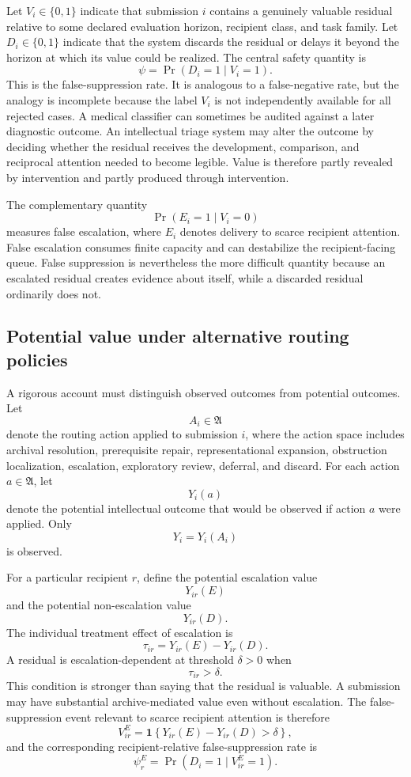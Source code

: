 \documentclass[11pt]{article}
\theoremstyle{definition}
\DeclareMathOperator{\Prob}{Pr}
\newcommand{\ind}{\mathbf{1}}
\begin{document}
Let \(V_i\in\{0,1\}\) indicate that submission \(i\) contains a genuinely valuable residual relative to some declared evaluation horizon, recipient class, and task family. Let \(D_i\in\{0,1\}\) indicate that the system discards the residual or delays it beyond the horizon at which its value could be realized. The central safety quantity is
\[
\psi
=
\Prob(D_i=1\mid V_i=1).
\]
This is the false-suppression rate. It is analogous to a false-negative rate, but the analogy is incomplete because the label \(V_i\) is not independently available for all rejected cases. A medical classifier can sometimes be audited against a later diagnostic outcome. An intellectual triage system may alter the outcome by deciding whether the residual receives the development, comparison, and reciprocal attention needed to become legible. Value is therefore partly revealed by intervention and partly produced through intervention.

The complementary quantity
\[
\Prob(E_i=1\mid V_i=0)
\]
measures false escalation, where \(E_i\) denotes delivery to scarce recipient attention. False escalation consumes finite capacity and can destabilize the recipient-facing queue. False suppression is nevertheless the more difficult quantity because an escalated residual creates evidence about itself, while a discarded residual ordinarily does not.

\subsection{Potential value under alternative routing policies}

A rigorous account must distinguish observed outcomes from potential outcomes. Let
\[
A_i\in\mathfrak{A}
\]
denote the routing action applied to submission \(i\), where the action space includes archival resolution, prerequisite repair, representational expansion, obstruction localization, escalation, exploratory review, deferral, and discard. For each action \(a\in\mathfrak{A}\), let
\[
Y_i(a)
\]
denote the potential intellectual outcome that would be observed if action \(a\) were applied. Only
\[
Y_i=Y_i(A_i)
\]
is observed.

For a particular recipient \(r\), define the potential escalation value
\[
Y_{ir}(E)
\]
and the potential non-escalation value
\[
Y_{ir}(D).
\]
The individual treatment effect of escalation is
\[
\tau_{ir}
=
Y_{ir}(E)-Y_{ir}(D).
\]
A residual is escalation-dependent at threshold \(\delta>0\) when
\[
\tau_{ir}>\delta.
\]
This condition is stronger than saying that the residual is valuable. A submission may have substantial archive-mediated value even without escalation. The false-suppression event relevant to scarce recipient attention is therefore
\[
V_{ir}^{E}
=
\ind\!\left\{
Y_{ir}(E)-Y_{ir}(D)>\delta
\right\},
\]
and the corresponding recipient-relative false-suppression rate is
\[
\psi_r^{E}
=
\Prob(D_i=1\mid V_{ir}^{E}=1).
\]
\end{document}
